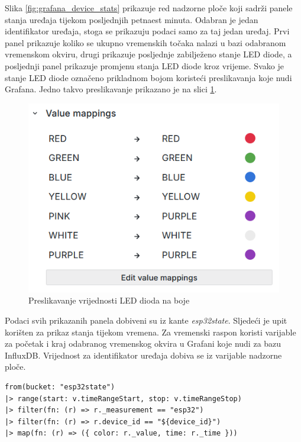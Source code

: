 Slika \ref{fig:grafana_device_stats} prikazuje red nadzorne ploče koji sadrži panele stanja uređaja tijekom posljednjih petnaest minuta. Odabran je jedan identifikator uređaja, stoga se prikazuju podaci samo za taj jedan uređaj. Prvi panel prikazuje koliko se ukupno vremenskih točaka nalazi u bazi odabranom vremenskom okviru, drugi prikazuje posljednje zabilježeno stanje LED diode, a posljednji panel prikazuje promjenu stanja LED diode kroz vrijeme. Svako je stanje LED diode označeno prikladnom bojom koristeći preslikavanja koje nudi Grafana. Jedno takvo preslikavanje prikazano je na slici \ref{fig:grafana_value_mapping}. 

\begin{figure}[ht]
	\centering
	\includegraphics[scale=0.6]{imgs/grafana_value_mapping}
	\caption{Preslikavanje vrijednosti LED dioda na boje}
	\label{fig:grafana_value_mapping}
\end{figure}

Podaci svih prikazanih panela dobiveni su iz kante \textit{esp32state}. Sljedeći je upit korišten za prikaz stanja tijekom vremena. Za vremenski raspon koristi varijable za početak i kraj odabranog vremenskog okvira u Grafani koje nudi  za bazu InfluxDB. Vrijednost za identifikator uređaja dobiva se iz varijable nadzorne ploče. 

\begin{lstlisting}[caption={Upit za dohvat stanja LED diode u vremenskom okviru}, language=flux]
from(bucket: "esp32state")
|> range(start: v.timeRangeStart, stop: v.timeRangeStop)
|> filter(fn: (r) => r._measurement == "esp32")
|> filter(fn: (r) => r.device_id == "${device_id}")
|> map(fn: (r) => ({ color: r._value, time: r._time }))
\end{lstlisting}

